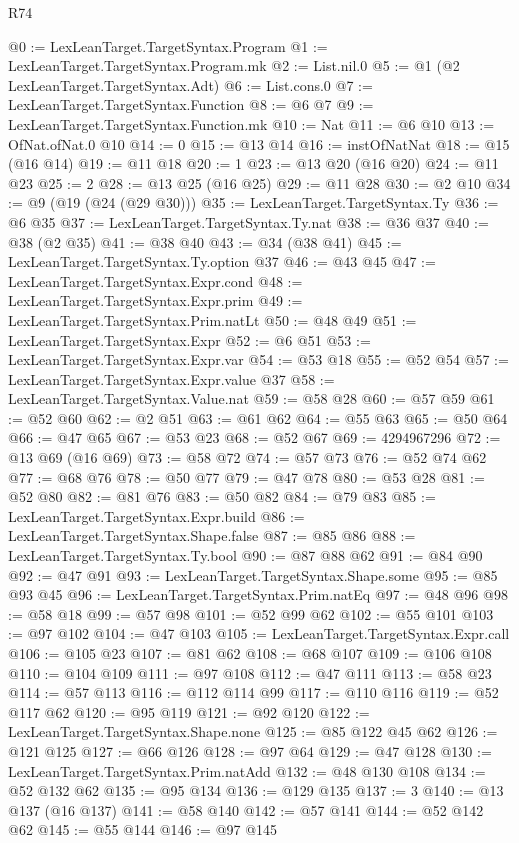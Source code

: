 \begin{lexlean}{R74}
\begin{coremodule}
@0 := LexLeanTarget.TargetSyntax.Program
@1 := LexLeanTarget.TargetSyntax.Program.mk
@2 := List.nil.{0}
@5 := @1 (@2 LexLeanTarget.TargetSyntax.Adt)
@6 := List.cons.{0}
@7 := LexLeanTarget.TargetSyntax.Function
@8 := @6 @7
@9 := LexLeanTarget.TargetSyntax.Function.mk
@10 := Nat
@11 := @6 @10
@13 := OfNat.ofNat.{0} @10
@14 := 0
@15 := @13 @14
@16 := instOfNatNat
@18 := @15 (@16 @14)
@19 := @11 @18
@20 := 1
@23 := @13 @20 (@16 @20)
@24 := @11 @23
@25 := 2
@28 := @13 @25 (@16 @25)
@29 := @11 @28
@30 := @2 @10
@34 := @9 (@19 (@24 (@29 @30)))
@35 := LexLeanTarget.TargetSyntax.Ty
@36 := @6 @35
@37 := LexLeanTarget.TargetSyntax.Ty.nat
@38 := @36 @37
@40 := @38 (@2 @35)
@41 := @38 @40
@43 := @34 (@38 @41)
@45 := LexLeanTarget.TargetSyntax.Ty.option @37
@46 := @43 @45
@47 := LexLeanTarget.TargetSyntax.Expr.cond
@48 := LexLeanTarget.TargetSyntax.Expr.prim
@49 := LexLeanTarget.TargetSyntax.Prim.natLt
@50 := @48 @49
@51 := LexLeanTarget.TargetSyntax.Expr
@52 := @6 @51
@53 := LexLeanTarget.TargetSyntax.Expr.var
@54 := @53 @18
@55 := @52 @54
@57 := LexLeanTarget.TargetSyntax.Expr.value @37
@58 := LexLeanTarget.TargetSyntax.Value.nat
@59 := @58 @28
@60 := @57 @59
@61 := @52 @60
@62 := @2 @51
@63 := @61 @62
@64 := @55 @63
@65 := @50 @64
@66 := @47 @65
@67 := @53 @23
@68 := @52 @67
@69 := 4294967296
@72 := @13 @69 (@16 @69)
@73 := @58 @72
@74 := @57 @73
@76 := @52 @74 @62
@77 := @68 @76
@78 := @50 @77
@79 := @47 @78
@80 := @53 @28
@81 := @52 @80
@82 := @81 @76
@83 := @50 @82
@84 := @79 @83
@85 := LexLeanTarget.TargetSyntax.Expr.build
@86 := LexLeanTarget.TargetSyntax.Shape.false
@87 := @85 @86
@88 := LexLeanTarget.TargetSyntax.Ty.bool
@90 := @87 @88 @62
@91 := @84 @90
@92 := @47 @91
@93 := LexLeanTarget.TargetSyntax.Shape.some
@95 := @85 @93 @45
@96 := LexLeanTarget.TargetSyntax.Prim.natEq
@97 := @48 @96
@98 := @58 @18
@99 := @57 @98
@101 := @52 @99 @62
@102 := @55 @101
@103 := @97 @102
@104 := @47 @103
@105 := LexLeanTarget.TargetSyntax.Expr.call
@106 := @105 @23
@107 := @81 @62
@108 := @68 @107
@109 := @106 @108
@110 := @104 @109
@111 := @97 @108
@112 := @47 @111
@113 := @58 @23
@114 := @57 @113
@116 := @112 @114 @99
@117 := @110 @116
@119 := @52 @117 @62
@120 := @95 @119
@121 := @92 @120
@122 := LexLeanTarget.TargetSyntax.Shape.none
@125 := @85 @122 @45 @62
@126 := @121 @125
@127 := @66 @126
@128 := @97 @64
@129 := @47 @128
@130 := LexLeanTarget.TargetSyntax.Prim.natAdd
@132 := @48 @130 @108
@134 := @52 @132 @62
@135 := @95 @134
@136 := @129 @135
@137 := 3
@140 := @13 @137 (@16 @137)
@141 := @58 @140
@142 := @57 @141
@144 := @52 @142 @62
@145 := @55 @144
@146 := @97 @145

\end{coremodule}
\end{lexlean}
